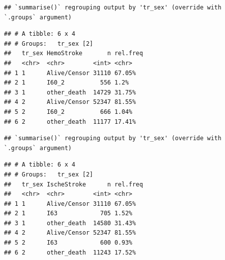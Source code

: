 \documentclass[
]{article}
\newenvironment{Shaded}{\begin{snugshade}}{\end{snugshade}}
\newcommand{\DataTypeTok}[1]{\textcolor[rgb]{0.13,0.29,0.53}{#1}}
\newcommand{\DecValTok}[1]{\textcolor[rgb]{0.00,0.00,0.81}{#1}}
\newcommand{\KeywordTok}[1]{\textcolor[rgb]{0.13,0.29,0.53}{\textbf{#1}}}
\newcommand{\NormalTok}[1]{#1}
\newcommand{\OperatorTok}[1]{\textcolor[rgb]{0.81,0.36,0.00}{\textbf{#1}}}
\newcommand{\StringTok}[1]{\textcolor[rgb]{0.31,0.60,0.02}{#1}}
\begin{document}
\begin{Shaded}
\begin{Highlighting}[]
{{{{\NormalTok{MILK_}\DecValTok{0}\OperatorTok{%
\StringTok{  }\KeywordTok{group_by}\NormalTok{(tr_sex, HemoStroke) }\OperatorTok{%
\StringTok{  }\KeywordTok{summarise}\NormalTok{(}\DataTypeTok{n=} \KeywordTok{n}\NormalTok{()) }\OperatorTok{%
\StringTok{  }\KeywordTok{mutate}\NormalTok{(}\DataTypeTok{rel.freq =} \KeywordTok{paste0}\NormalTok{(}\KeywordTok{round}\NormalTok{(}\DecValTok{100} \OperatorTok{*}\StringTok{ }\NormalTok{n}\OperatorTok{/}\KeywordTok{sum}\NormalTok{(n), }\DecValTok{2}\NormalTok{), }\StringTok{"%
\end{Highlighting}
\end{Shaded}

\begin{verbatim}
## `summarise()` regrouping output by 'tr_sex' (override with `.groups` argument)
\end{verbatim}

\begin{verbatim}
## # A tibble: 6 x 4
## # Groups:   tr_sex [2]
##   tr_sex HemoStroke       n rel.freq
##   <chr>  <chr>        <int> <chr>   
## 1 1      Alive/Censor 31110 67.05%  
## 2 1      I60_2          556 1.2%    
## 3 1      other_death  14729 31.75%  
## 4 2      Alive/Censor 52347 81.55%  
## 5 2      I60_2          666 1.04%   
## 6 2      other_death  11177 17.41%
\end{verbatim}

\begin{Shaded}
\end{Shaded}

\begin{verbatim}
## `summarise()` regrouping output by 'tr_sex' (override with `.groups` argument)
\end{verbatim}

\begin{verbatim}
## # A tibble: 6 x 4
## # Groups:   tr_sex [2]
##   tr_sex IscheStroke      n rel.freq
##   <chr>  <chr>        <int> <chr>   
## 1 1      Alive/Censor 31110 67.05%  
## 2 1      I63            705 1.52%   
## 3 1      other_death  14580 31.43%  
## 4 2      Alive/Censor 52347 81.55%  
## 5 2      I63            600 0.93%   
## 6 2      other_death  11243 17.52%
\end{verbatim}
\end{document}
